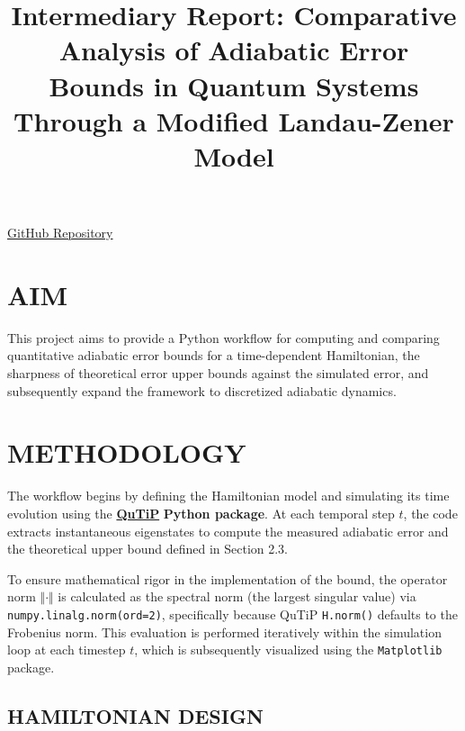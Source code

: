 \documentclass[11pt,a4paper]{article}
\title{\bfseries \large \vspace{-1.4cm} Intermediary Report: Comparative Analysis of Adiabatic Error Bounds in Quantum Systems Through a Modified Landau-Zener Model}
\date{}
\begin{document}
\maketitle 
\vspace{-2cm}
\begin{center}
\vspace{-0.4cm} \href{https://github.com/Usernotfoundoops/Adibatic_Quantum_Computing/blob/master/AQC_3%20level%20jpq.ipynb}{GitHub Repository} \end{center}
\vspace{-1cm}
\section{AIM}

This project aims to provide a Python workflow for computing and comparing quantitative adiabatic error bounds for a time-dependent Hamiltonian, the sharpness of theoretical error upper bounds against the simulated error, and subsequently expand the framework to discretized adiabatic dynamics.
\vspace{-0.2cm}
\section{METHODOLOGY}

The workflow begins by defining the Hamiltonian model and simulating its time evolution using the \href{https://doi.org/10.1016/j.physrep.2025.10.001}{\textbf{QuTiP}} \textbf{Python package}. At each temporal step $t$, the code extracts instantaneous eigenstates to compute the measured adiabatic error and the theoretical upper bound defined in Section 2.3. 
\vspace{0.1cm}

To ensure mathematical rigor in the implementation of the bound, the operator norm $\Vert\cdot\Vert$ is calculated as the spectral norm (the largest singular value) via \texttt{numpy.linalg.norm(ord=2)}, specifically because QuTiP \texttt{H.norm()} defaults to the Frobenius norm. This evaluation is performed iteratively within the simulation loop at each timestep $t$, which is subsequently visualized using the \texttt{Matplotlib} package.
\vspace{-0.2cm}
\subsection{HAMILTONIAN DESIGN}
\end{document}
